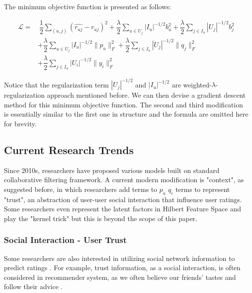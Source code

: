 \documentclass[letter paper, 11pt]{article}
\begin{document}
	The minimum objective function is presented as follows:
	
	\begin{equation}
		\tag*{First Modification of Extended SVD++}
		\begin{split}
			\mathcal{L} = &\ \dfrac{1}{2} \sum_{(u, j)} (\hat{r_{uj}} - r_{uj})^2 + \dfrac{\lambda}{2} \sum_{u \in U_j} |I_u|^{-1/2} b_u^2 + \dfrac{\lambda}{2} \sum_{j \in I_u} |U_j|^{-1/2} b_j^2 \\
			& + \dfrac{\lambda}{2} \sum_{u \in U_j} |I_u|^{-1/2} \|p_u\|_F^{2} + \dfrac{\lambda}{2} \sum_{j \in I_u} |U_j|^{-1/2} \|q_j\|_F^{2} \\
			& + \dfrac{\lambda}{2} \sum_{j \in I_u} |U_i|^{-1/2} \|y_i\|_F^{2}
		\end{split}
	\end{equation}
	
	Notice that the regularization term $|U_j|^{-1/2}$ and $|I_u|^{-1/2}$ are weighted-$\lambda$-regularization approach mentioned before. We can then devise a gradient descent method for this minimum objective function. The second and third modification is essentially similar to the first one in structure and the formula are omitted here for brevity.
	
	
	\subsection{Current Research Trends}
	Since 2010s, researchers have proposed various models built on standard collaborative filtering framework. A current modern modification is "context", as suggested before, in which researchers add terms to $p_u$ $q_i$ terms to represent "trust", an abstraction of user-user social interaction that influence user ratings. Some researchers even represent the latent factors in Hilbert Feature Space and play the "kernel trick" \cite{Kernel-MF} but this is beyond the scope of this paper.
	
	\subsubsection{Social Interaction - User Trust}
	
	Some researchers are also interested in utilizing social network information to predict ratings \cite{social-regularization} \cite{review}. For example, trust information, as a social interaction, is often considered in recommender system, as we often believe our friends' tastes and follow their advice \cite{social-regularization}.
	
\end{document}

